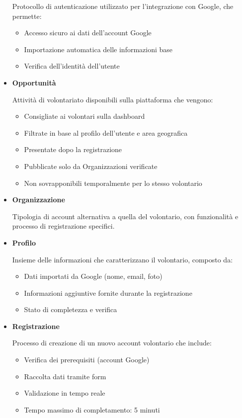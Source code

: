 \begin{itemize}
Protocollo di autenticazione utilizzato per l'integrazione con Google, che permette:
\begin{itemize}
    \item Accesso sicuro ai dati dell'account Google
    \item Importazione automatica delle informazioni base
    \item Verifica dell'identità dell'utente
\end{itemize}

\item \textbf{Opportunità}

Attività di volontariato disponibili sulla piattaforma che vengono:
\begin{itemize}
    \item Consigliate ai volontari sulla dashboard
    \item Filtrate in base al profilo dell'utente e area geografica
    \item Presentate dopo la registrazione
    \item Pubblicate solo da Organizzazioni verificate
    \item Non sovrapponibili temporalmente per lo stesso volontario
\end{itemize}

\item \textbf{Organizzazione}

Tipologia di account alternativa a quella del volontario, con funzionalità e processo di registrazione specifici.

\item \textbf{Profilo}

Insieme delle informazioni che caratterizzano il volontario, composto da:
\begin{itemize}
    \item Dati importati da Google (nome, email, foto)
    \item Informazioni aggiuntive fornite durante la registrazione
    \item Stato di completezza e verifica
\end{itemize}

\item \textbf{Registrazione}

Processo di creazione di un nuovo account volontario che include:
\begin{itemize}
    \item Verifica dei prerequisiti (account Google)
    \item Raccolta dati tramite form
    \item Validazione in tempo reale
    \item Tempo massimo di completamento: 5 minuti
\end{itemize}


\end{itemize}
